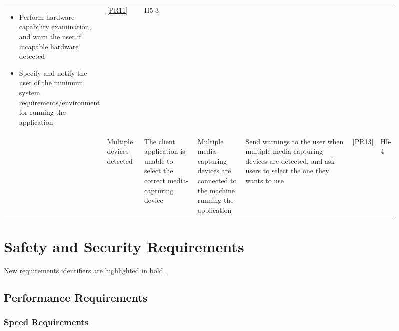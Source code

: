\documentclass{article}
\begin{document}
\begin{landscape}
\begin{longtable}[h]{L{0.09\linewidth}L{0.1\linewidth}L{0.15\linewidth}L{0.13\linewidth}L{0.35\linewidth}L{0.05\linewidth}L{0.04\linewidth}}
      \begin{itemize}[nosep,topsep=0pt,leftmargin=10pt]
      \item Perform hardware capability examination, and warn the user if incapable
        hardware detected
      \item Specify and notify the user of the minimum system
        requirements/environment for running the application
      \end{itemize}
      \vspace{-1.1\topsep}
    & \ref{PR11}
    & H5-3\\
    & Multiple devices detected
    & The client application is unable to select the correct media-capturing device
    & Multiple media-capturing devices are connected to the machine running the application
    & Send warnings to the user when multiple media capturing devices are detected, and ask users to select the one they wants to use
    & \ref{PR13}
    & H5-4\\
  \end{longtable}
\end{landscape}
\restoregeometry

\section{Safety and Security Requirements}

New requirements identifiers are highlighted in bold.

\subsection{Performance Requirements}

\subsubsection{Speed Requirements}
\end{document}
